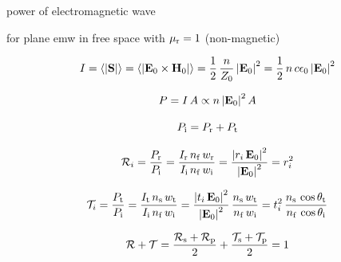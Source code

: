 power of electromagnetic wave

\cite[Chapter 7]{Jackson2013}


for plane emw in free space with $\mu_{\mathrm{r}} = 1$ (non-magnetic)

\begin{equation}
  I = \left\langle \abs{\vb{S}} \right\rangle = 
  \left\langle \abs{\vb{E}_{0}\times\vb{H}_{0}} \right\rangle = 
  \frac{1}{2}\,\frac{n}{Z_{0}}\,\abs{\vb{E}_{0}}^{2} = 
  \frac{1}{2}\,n\,c\epsilon_{0}\,\abs{\vb{E}_{0}}^{2}
\end{equation}

\begin{equation}
  P = I\,A \propto n\,\abs{\vb{E}_{0}}^{2}\,A
\end{equation}

\begin{equation}
  P_{\mathrm{i}} = P_{\mathrm{r}} + P_{\mathrm{t}}
\end{equation}


\begin{equation}
  \mathcal{R}_{i} = \frac{P_{\mathrm{r}}}{P_{\mathrm{i}}} = 
  \frac{I_{\mathrm{r}}\,n_{\mathrm{f}}\,w_{\mathrm{r}}}{I_{\mathrm{i}}\,n_{\mathrm{f}}\,w_{\mathrm{i}}} 
  =\frac{\abs{r_{i}\,\vb{E}_{0}}^{2}}{\abs{\vb{E}_{0}}^{2}} = 
  r_{i}^{2}
\end{equation}

\begin{equation}
  \mathcal{T}_{i} = \frac{P_{\mathrm{t}}}{P_{\mathrm{i}}} = 
  \frac{I_{\mathrm{t}}\,n_{\mathrm{s}}\,w_{\mathrm{t}}}{I_{\mathrm{i}}\,n_{\mathrm{f}}\,w_{\mathrm{i}}} 
  =\frac{\abs{t_{i}\,\vb{E}_{0}}^{2}}{\abs{\vb{E}_{0}}^{2}}\,\frac{n_{\mathrm{s}}\,w_{\mathrm{t}}}{n_{\mathrm{f}}\,w_{\mathrm{i}}} 
  = t_{i}^{2}\,\frac{n_{\mathrm{s}}\,\cos\theta_{\mathrm{t}}}{n_{\mathrm{f}}\,\cos\theta_{\mathrm{i}}}
\end{equation}



\begin{equation}
  \mathcal{R} + \mathcal{T} = 
  \frac{\mathcal{R}_{\mathrm{s}}+\mathcal{R}_{\mathrm{p}}}{2} +
  \frac{\mathcal{T}_{\mathrm{s}}+\mathcal{T}_{\mathrm{p}}}{2} = 1 
  \label{eq:Th-fresnel}
\end{equation}


